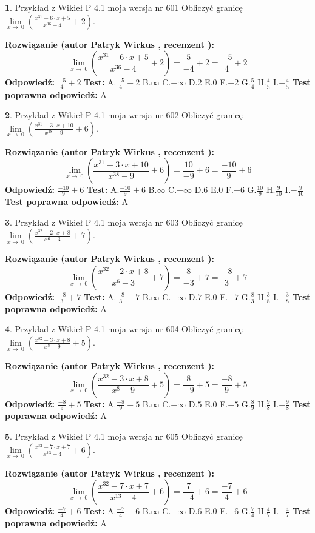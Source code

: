\documentclass[12pt, a4paper]{article}
\theoremstyle{definition} %
\newtheorem{zad}{}
\newcommand{\zadStart}[1]{\begin{zad}#1\newline}
\newcommand{\zadStop}{\end{zad}}
\newcommand{\rozwStart}[2]{\noindent \textbf{Rozwiązanie (autor #1 , recenzent #2): }\newline}
\newcommand{\rozwStop}{\newline}
\newcommand{\odpStart}{\noindent \textbf{Odpowiedź:}\newline}
\newcommand{\odpStop}{\newline}
\newcommand{\testStart}{\noindent \textbf{Test:}\newline}
\newcommand{\testStop}{\newline}
\newcommand{\kluczStart}{\noindent \textbf{Test poprawna odpowiedź:}\newline}
\newcommand{\kluczStop}{\newline}
\begin{document}
\zadStart{Przykład z Wikieł P 4.1 moja wersja nr 601}
Obliczyć granicę $\lim\limits_{x\to\ 0}(\frac{x^{31}-6 \cdot x +5}{x^{36}-4}+2)$.
\zadStop
\rozwStart{Patryk Wirkus}{}
$$\lim\limits_{x\to\ 0}(\frac{x^{31}-6 \cdot x +5}{x^{36}-4}+2)=\frac{5}{-4}+2=\frac{-5}{4}+2$$
\rozwStop
\odpStart
$\frac{-5}{4}+2$
\odpStop
\testStart
A.$\frac{-5}{4}+2$
B.$\infty$
C.$-\infty$
D.$2$
E.$0$
F.$-2$
G.$\frac{5}{4}$
H.$\frac{4}{5}$
I.$-\frac{4}{5}$
\testStop
\kluczStart
A
\kluczStop



\zadStart{Przykład z Wikieł P 4.1 moja wersja nr 602}
Obliczyć granicę $\lim\limits_{x\to\ 0}(\frac{x^{31}-3 \cdot x +10}{x^{38}-9}+6)$.
\zadStop
\rozwStart{Patryk Wirkus}{}
$$\lim\limits_{x\to\ 0}(\frac{x^{31}-3 \cdot x +10}{x^{38}-9}+6)=\frac{10}{-9}+6=\frac{-10}{9}+6$$
\rozwStop
\odpStart
$\frac{-10}{9}+6$
\odpStop
\testStart
A.$\frac{-10}{9}+6$
B.$\infty$
C.$-\infty$
D.$6$
E.$0$
F.$-6$
G.$\frac{10}{9}$
H.$\frac{9}{10}$
I.$-\frac{9}{10}$
\testStop
\kluczStart
A
\kluczStop



\zadStart{Przykład z Wikieł P 4.1 moja wersja nr 603}
Obliczyć granicę $\lim\limits_{x\to\ 0}(\frac{x^{32}-2 \cdot x +8}{x^{6}-3}+7)$.
\zadStop
\rozwStart{Patryk Wirkus}{}
$$\lim\limits_{x\to\ 0}(\frac{x^{32}-2 \cdot x +8}{x^{6}-3}+7)=\frac{8}{-3}+7=\frac{-8}{3}+7$$
\rozwStop
\odpStart
$\frac{-8}{3}+7$
\odpStop
\testStart
A.$\frac{-8}{3}+7$
B.$\infty$
C.$-\infty$
D.$7$
E.$0$
F.$-7$
G.$\frac{8}{3}$
H.$\frac{3}{8}$
I.$-\frac{3}{8}$
\testStop
\kluczStart
A
\kluczStop



\zadStart{Przykład z Wikieł P 4.1 moja wersja nr 604}
Obliczyć granicę $\lim\limits_{x\to\ 0}(\frac{x^{32}-3 \cdot x +8}{x^{8}-9}+5)$.
\zadStop
\rozwStart{Patryk Wirkus}{}
$$\lim\limits_{x\to\ 0}(\frac{x^{32}-3 \cdot x +8}{x^{8}-9}+5)=\frac{8}{-9}+5=\frac{-8}{9}+5$$
\rozwStop
\odpStart
$\frac{-8}{9}+5$
\odpStop
\testStart
A.$\frac{-8}{9}+5$
B.$\infty$
C.$-\infty$
D.$5$
E.$0$
F.$-5$
G.$\frac{8}{9}$
H.$\frac{9}{8}$
I.$-\frac{9}{8}$
\testStop
\kluczStart
A
\kluczStop



\zadStart{Przykład z Wikieł P 4.1 moja wersja nr 605}
Obliczyć granicę $\lim\limits_{x\to\ 0}(\frac{x^{32}-7 \cdot x +7}{x^{13}-4}+6)$.
\zadStop
\rozwStart{Patryk Wirkus}{}
$$\lim\limits_{x\to\ 0}(\frac{x^{32}-7 \cdot x +7}{x^{13}-4}+6)=\frac{7}{-4}+6=\frac{-7}{4}+6$$
\rozwStop
\odpStart
$\frac{-7}{4}+6$
\odpStop
\testStart
A.$\frac{-7}{4}+6$
B.$\infty$
C.$-\infty$
D.$6$
E.$0$
F.$-6$
G.$\frac{7}{4}$
H.$\frac{4}{7}$
I.$-\frac{4}{7}$
\testStop
\kluczStart
A
\kluczStop
\end{document}
